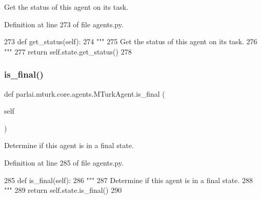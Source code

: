 \begin{DoxyVerb}Get the status of this agent on its task.
\end{DoxyVerb}
 

Definition at line 273 of file agents.\+py.


\begin{DoxyCode}
273     \textcolor{keyword}{def }get\_status(self):
274         \textcolor{stringliteral}{"""}
275 \textcolor{stringliteral}{        Get the status of this agent on its task.}
276 \textcolor{stringliteral}{        """}
277         \textcolor{keywordflow}{return} self.state.get\_status()
278 
\end{DoxyCode}
\mbox{\label{classparlai_1_1mturk_1_1core_1_1agents_1_1MTurkAgent_ab7e57409d6591f78a3b9d28c5a0f98e6}} 
\subsubsection{\texorpdfstring{is\+\_\+final()}{is\_final()}}
{\footnotesize\ttfamily def parlai.\+mturk.\+core.\+agents.\+M\+Turk\+Agent.\+is\+\_\+final (\begin{DoxyParamCaption}\item[{}]{self }\end{DoxyParamCaption})}

\begin{DoxyVerb}Determine if this agent is in a final state.
\end{DoxyVerb}
 

Definition at line 285 of file agents.\+py.


\begin{DoxyCode}
285     \textcolor{keyword}{def }is\_final(self):
286         \textcolor{stringliteral}{"""}
287 \textcolor{stringliteral}{        Determine if this agent is in a final state.}
288 \textcolor{stringliteral}{        """}
289         \textcolor{keywordflow}{return} self.state.is\_final()
290 
\end{DoxyCode}
\mbox{\label{classparlai_1_1mturk_1_1core_1_1agents_1_1MTurkAgent_a2bf924f7dd6838441403e0045d9a0cd1}} 
